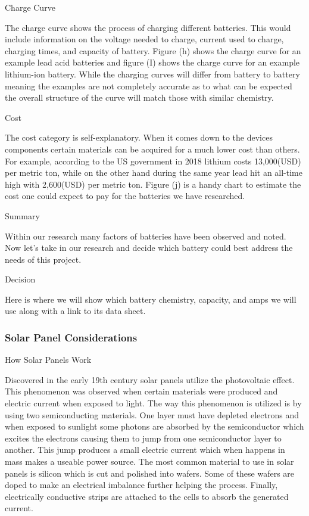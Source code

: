 Charge Curve 

The charge curve shows the process of charging different batteries. This would include information on the voltage needed to charge, current used to charge, charging times, and capacity of battery. Figure (h) shows the charge curve for an example lead acid batteries and figure (I) shows the charge curve for an example lithium-ion battery. While the charging curves will differ from battery to battery meaning the examples are not completely accurate as to what can be expected the overall structure of the curve will match those with similar chemistry. 

Cost 

The cost category is self-explanatory. When it comes down to the devices components certain materials can be acquired for a much lower cost than others. For example, according to the US government in 2018 lithium costs 13,000(USD) per metric ton, while on the other hand during the same year lead hit an all-time high with 2,600(USD) per metric ton. Figure (j) is a handy chart to estimate the cost one could expect to pay for the batteries we have researched. 

Summary 

Within our research many factors of batteries have been observed and noted. Now let's take in our research and decide which battery could best address the needs of this project. 

Decision 

Here is where we will show which battery chemistry, capacity, and amps we will use along with a link to its data sheet. 

\subsubsection{Solar Panel Considerations}
How Solar Panels Work 

Discovered in the early 19th century solar panels utilize the photovoltaic effect. This phenomenon was observed when certain materials were produced and electric current when exposed to light. The way this phenomenon is utilized is by using two semiconducting materials. One layer must have depleted electrons and when exposed to sunlight some photons are absorbed by the semiconductor which excites the electrons causing them to jump from one semiconductor layer to another. This jump produces a small electric current which when happens in mass makes a useable power source. The most common material to use in solar panels is silicon which is cut and polished into wafers. Some of these wafers are doped to make an electrical imbalance further helping the process. Finally, electrically conductive strips are attached to the cells to absorb the generated current. 

